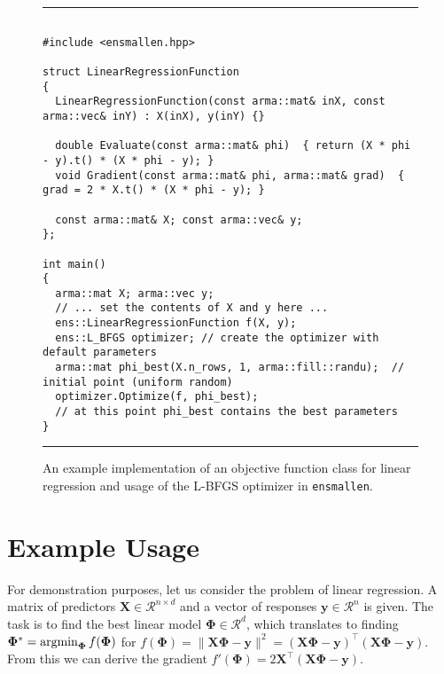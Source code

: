 \documentclass[twoside,11pt]{article}
\begin{document}
\begin{figure}[b!]
\hrule
\vspace{1ex}
\centering
\begin{verbatim}

#include <ensmallen.hpp>

struct LinearRegressionFunction
{
  LinearRegressionFunction(const arma::mat& inX, const arma::vec& inY) : X(inX), y(inY) {}

  double Evaluate(const arma::mat& phi)  { return (X * phi - y).t() * (X * phi - y); }
  void Gradient(const arma::mat& phi, arma::mat& grad)  { grad = 2 * X.t() * (X * phi - y); }

  const arma::mat& X; const arma::vec& y;
};

int main()
{
  arma::mat X; arma::vec y;
  // ... set the contents of X and y here ...
  ens::LinearRegressionFunction f(X, y);
  ens::L_BFGS optimizer; // create the optimizer with default parameters
  arma::mat phi_best(X.n_rows, 1, arma::fill::randu);  // initial point (uniform random)
  optimizer.Optimize(f, phi_best);
  // at this point phi_best contains the best parameters
}
\end{verbatim}
\hrule
\vspace*{-0.5em}
\caption{An example implementation of an objective function class for linear
regression and usage of the L-BFGS optimizer in {\tt ensmallen}.
}
\label{fig:lr_function}
\vspace*{-2em}
\end{figure}


\section{Example Usage}
\label{sec:linreg_example}

For demonstration purposes, let us consider the problem of linear regression.
A matrix of predictors $\bm X \in \mathcal{R}^{n \times d}$
and a vector of responses $\bm y \in \mathcal{R}^n$ is given.
The task is to find the best linear model $\bm \Phi \in \mathcal{R}^d$,
which translates to finding
$\bm \Phi^* = \operatornamewithlimits{argmin}_{\bm\Phi} f(\bm \Phi)$ for
$f(\bm \Phi) = \| \bm X \bm \Phi - \bm y \|^2 = (\bm X \bm \Phi - \bm y)^{\top} (\bm X \bm \Phi - \bm y).$
From this we can derive the gradient
$f'(\bm \Phi) = 2 \bm X^{\top} (\bm X \bm \Phi - \bm y).$
\end{document}
